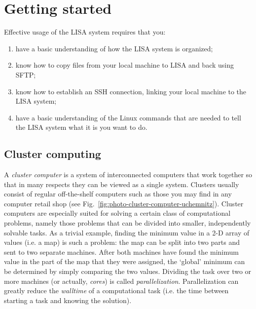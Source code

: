 \chapter{Getting started}
\label{ch:getting-started}

Effective usage of the LISA system requires that you:
\begin{enumerate}
\item{have a basic understanding of how the LISA system is organized;}
\item{know how to copy files from your local machine to LISA and back using SFTP;}
\item{know how to establish an SSH connection, linking your local machine to the LISA system;}
\item{have a basic understanding of the Linux commands that are needed to tell the LISA system what it is you want to do.}
\end{enumerate}



\section{Cluster computing}

A \textit{cluster computer} is a system of interconnected computers that work together so that in many respects they can be viewed as a single system. Clusters usually consist of regular \mbox{off-the-shelf} computers such as those you may find in any computer retail shop (see Fig.~\ref{fig:photo-cluster-computer-uchemnitz}). Cluster computers are especially suited for solving a certain class of computational problems, namely those problems that can be divided into smaller, independently solvable tasks. As a trivial example, finding the minimum value in a 2-D array of values (i.e. a map) is such a problem: the map can be split into two parts and sent to two separate machines. After both machines have found the minimum value in the part of the map that they were assigned, the `global' minimum can be determined by simply comparing the two values. Dividing the task over two or more machines (or actually, \textit{cores}) is called \textit{parallelization}. Parallelization can greatly reduce the \textit{walltime} of a computational task (i.e. the time between starting a task and knowing the solution). 

